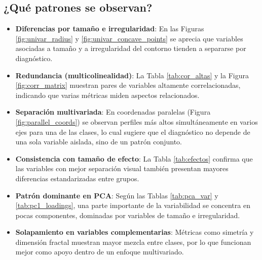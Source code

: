 \documentclass[12pt,a4paper]{article}
\begin{document}
\begin{table}[H]
\centering
\caption{Top 10 variables por tamaño de efecto (Cohen's $d$) entre M y B.}
\label{tab:efectos}
\small

\normalsize
\end{table}

\begin{table}[H]
\centering
\caption{Varianza explicada por PCA (primeras 5 componentes) sobre variables estandarizadas.}
\label{tab:pca_var}

\end{table}

\begin{table}[H]
\centering
\caption{Variables con mayor contribución (carga) absoluta en PC1.}
\label{tab:pc1_loadings}
\small

\normalsize
\end{table}

\subsection{¿Qué patrones se observan?}
\begin{itemize}
    \item \textbf{Diferencias por tamaño e irregularidad}: En las Figuras \ref{fig:univar_radius} y \ref{fig:univar_concave_points} se aprecia que variables asociadas a tamaño y a irregularidad del contorno tienden a separarse por diagnóstico.
    \item \textbf{Redundancia (multicolinealidad)}: La Tabla \ref{tab:cor_altas} y la Figura \ref{fig:corr_matrix} muestran pares de variables altamente correlacionadas, indicando que varias métricas miden aspectos relacionados.
    \item \textbf{Separación multivariada}: En coordenadas paralelas (Figura \ref{fig:parallel_coords}) se observan perfiles más altos simultáneamente en varios ejes para una de las clases, lo cual sugiere que el diagnóstico no depende de una sola variable aislada, sino de un patrón conjunto.
    \item \textbf{Consistencia con tamaño de efecto}: La Tabla \ref{tab:efectos} confirma que las variables con mejor separación visual también presentan mayores diferencias estandarizadas entre grupos.
    \item \textbf{Patrón dominante en PCA}: Según las Tablas \ref{tab:pca_var} y \ref{tab:pc1_loadings}, una parte importante de la variabilidad se concentra en pocas componentes, dominadas por variables de tamaño e irregularidad.
    \item \textbf{Solapamiento en variables complementarias}: Métricas como simetría y dimensión fractal muestran mayor mezcla entre clases, por lo que funcionan mejor como apoyo dentro de un enfoque multivariado.
\end{itemize}
\end{document}
